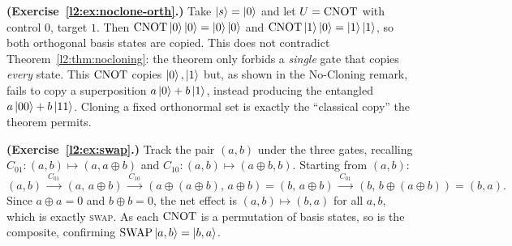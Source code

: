 \begin{solution}
\textbf{(Exercise~\ref{l2:ex:noclone-orth}.)} Take $\ket{s}=\ket{0}$ and let
$U=\mathrm{CNOT}$ with control $0$, target $1$. Then $\mathrm{CNOT}\ket{0}\ket{0}=\ket{0}\ket{0}$
and $\mathrm{CNOT}\ket{1}\ket{0}=\ket{1}\ket{1}$, so both orthogonal basis states are
copied. This does not contradict Theorem~\ref{l2:thm:nocloning}: the theorem only
forbids a \emph{single} gate that copies \emph{every} state. This $\mathrm{CNOT}$
copies $\ket{0},\ket{1}$ but, as shown in the No-Cloning remark, fails to copy a
superposition $a\ket{0}+b\ket{1}$, instead producing the entangled
$a\ket{00}+b\ket{11}$. Cloning a fixed orthonormal set is exactly the ``classical
copy'' the theorem permits.
\end{solution}

\begin{solution}
\textbf{(Exercise~\ref{l2:ex:swap}.)} Track the pair $(a,b)$ under the three gates,
recalling $C_{01}:(a,b)\mapsto(a,a\oplus b)$ and $C_{10}:(a,b)\mapsto
(a\oplus b,b)$. Starting from $(a,b)$:
\[
  (a,b)\ \xrightarrow{C_{01}}\ (a,\,a\oplus b)
       \ \xrightarrow{C_{10}}\ (a\oplus(a\oplus b),\,a\oplus b)=(b,\,a\oplus b)
       \ \xrightarrow{C_{01}}\ (b,\,b\oplus(a\oplus b))=(b,a).
\]
Since $a\oplus a=0$ and $b\oplus b=0$, the net effect is $(a,b)\mapsto(b,a)$ for
all $a,b$, which is exactly \textsc{swap}. As each $\mathrm{CNOT}$ is a permutation of
basis states, so is the composite, confirming
$\mathrm{SWAP}\ket{a,b}=\ket{b,a}$.
\end{solution}
